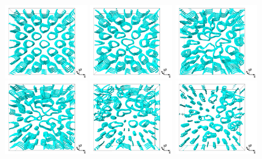 \documentclass[8.5pt,twoside,twocolumn]{article}
\begin{document}
\begin{figure}[htpb]
\includegraphics[width=0.32\textwidth]{disc-600k_run915r.png}
\includegraphics[width=0.32\textwidth]{disc-675k_run915r.png}
\includegraphics[width=0.32\textwidth]{disc-700k_run915r.png}\\
\includegraphics[width=0.32\textwidth]{disc-725k_run915r.png}
\includegraphics[width=0.32\textwidth]{disc-1000k_run915r.png}
\includegraphics[width=0.32\textwidth]{disc-1200k_run915r.png}
\caption{}
\label{bp1-3-disc}
\end{figure}
\end{document}
